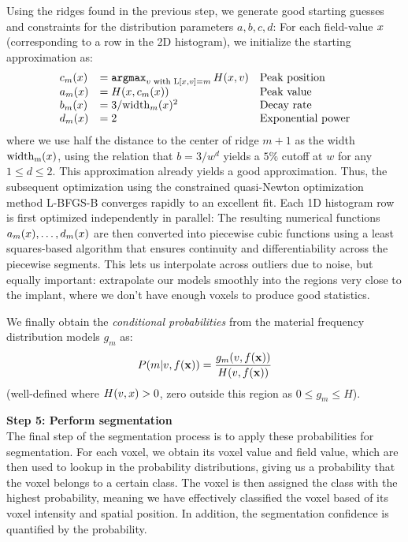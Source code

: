 Using the ridges found in the previous step, we generate good starting
guesses and constraints for the distribution parameters
$a,b,c,d$:
For each field-value $x$ (corresponding to a row in the 2D histogram),
we initialize the starting approximation as:
\begin{equation}
  \label{eq:starting-guesses}
  \begin{array}{lll}
    c_m(x) &= \mathop{\mathtt{argmax}}_{v \text{ with }\mathrm{L}[x,v] = m} H(x,v)  & \text{Peak position}  \\
    a_m(x) &= H(x,c_m(x)) & \text{Peak value}\\
    b_m(x) &= 3/\mathrm{width}_m(x)^2  & \text{Decay rate}\\
    d_m(x) &= 2 & \text{Exponential power}
  \end{array}
\end{equation}
where we use half the distance to the center of ridge $m+1$ as the width
$\mathrm{width_m}(x)$, using the relation that $b = 3/w^d$ yields
a $5\%$ cutoff at $w$ for any $1\le d \le 2$. This approximation
already yields a good approximation. Thus, the subsequent
optimization using the constrained quasi-Newton optimization method L-BFGS-B\cite{BFGS}
converges rapidly to an excellent fit. Each 1D histogram row is first optimized
independently in parallel: The resulting numerical functions
$a_m(x),\ldots,d_m(x)$ are then converted into piecewise cubic
functions using a least squares-based algorithm that ensures continuity
and differentiability across the piecewise segments. This lets us interpolate across
outliers due to noise, but equally important:
extrapolate our models smoothly into the regions very close to the implant, where
we don't have enough voxels to produce good statistics.

We finally obtain the {\it conditional probabilities} from the material frequency distribution
models $g_m$ as:
\begin{equation}
  \label{eq:Pm}
  P\!\left(m\middle\vert v,f(\mathbf{x})\right) = \frac{g_m(v,f(\mathbf{x}))}{H(v,f(\mathbf{x}))}
\end{equation}
(well-defined where $H(v,x) > 0$, zero outside this region as $0\le g_m \le H$).


\vspace{\baselineskip}
\noindent\textbf{Step 5: Perform segmentation} \\
The final step of the segmentation process is to apply these probabilities for segmentation.
For each voxel, we obtain its voxel value and field value, which are then used to lookup in the probability distributions, giving us a probability that the voxel belongs to a certain class.
The voxel is then assigned the class with the highest probability, meaning we have effectively classified the voxel based of its voxel intensity and spatial position. In addition,
the segmentation confidence is quantified by the probability.

